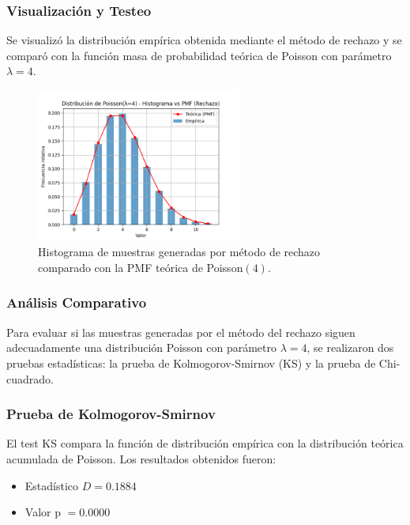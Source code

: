 \documentclass{article}
\begin{document}
\vspace{0.5em}
\subsubsection{Visualización y Testeo}

Se visualizó la distribución empírica obtenida mediante el método de rechazo y se comparó con la función masa de probabilidad teórica de Poisson con parámetro $\lambda=4$.

\begin{figure}[H]
    \centering
    \includegraphics[width=0.6\textwidth]{visualizaciones/poisson_rechazo.png}
    \caption{Histograma de muestras generadas por método de rechazo comparado con la PMF teórica de Poisson$(4)$.}
    \label{fig:poisson_rechazo}
\end{figure}

\subsubsection{Análisis Comparativo}

Para evaluar si las muestras generadas por el método del rechazo siguen adecuadamente una distribución Poisson con parámetro \(\lambda = 4\), se realizaron dos pruebas estadísticas: la prueba de Kolmogorov-Smirnov (KS) y la prueba de Chi-cuadrado.

\subsubsection{Prueba de Kolmogorov-Smirnov}

El test KS compara la función de distribución empírica con la distribución teórica acumulada de Poisson. Los resultados obtenidos fueron:

\begin{itemize}
    \item Estadístico \(D = 0.1884\)
    \item Valor p \(= 0.0000\)
\end{itemize}
\end{document}
